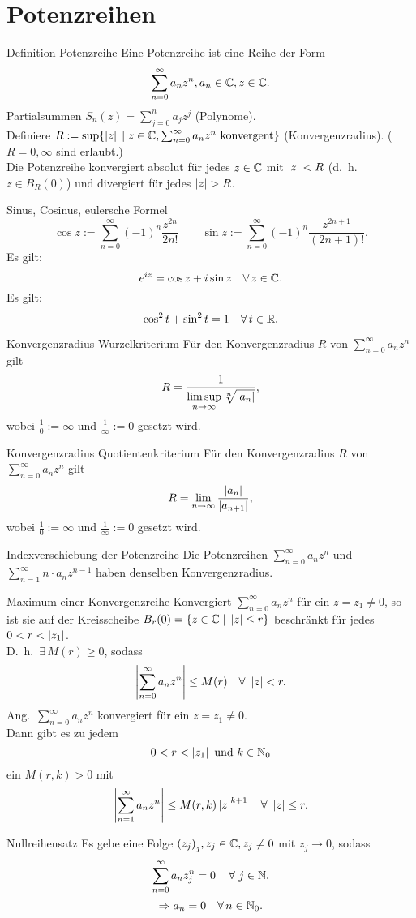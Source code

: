 \documentclass[main.tex]{subfiles}
\begin{document}
\section*{Potenzreihen}

\begin{karte}{Definition Potenzreihe}
    Eine Potenzreihe ist eine Reihe der Form
    \[ \sum_{n=0}^\infty a_n z^n, a_n \in\mathbb{C}, z \in\mathbb{C}. \]
    Partialsummen \( S_n(z) = \sum_{j=0}^n a_j z^j \) (Polynome).\\
    Definiere \( R:= \sup \{ \left| z \right| \;\vert \; z\in\mathbb{C}, 
    \sum_{n=0}^\infty a_n z^n \text{ konvergent} \} \)
    (Konvergenzradius). (\( R = 0, \infty \) sind erlaubt.)\\
    Die Potenzreihe konvergiert absolut für jedes \( z\in\mathbb{C} \) 
    mit \( \left| z \right| < R \) (d.\ h.\  \( z\in B_R(0) \)) 
    und divergiert für jedes \( \left| z \right| > R \).
\end{karte}
\begin{karte}{Sinus, Cosinus, eulersche Formel}
    \[ \cos z := \sum_{n=0}^\infty {(-1)}^n \frac{z^{2n}}{2n!} 
    \qquad \sin z  := \sum_{n=0}^\infty {(-1)}^n 
    \frac{z^{2n+1}}{(2n+1)!}. \]
    Es gilt:
    \[ e^{iz} = \cos z + i \sin z \quad \forall z\in\C. \]
    Es gilt:
    \[ \cos^2 t + \sin^2 t = 1 \quad \forall t \in \R. \]
\end{karte}
\begin{karte}{Konvergenzradius Wurzelkriterium}
    Für den Konvergenzradius \( R \) von 
    \( \sum_{n=0}^\infty a_n z^n \) gilt
    \[ R = \frac{1}{\limsup\limits_{n\rightarrow\infty} \sqrt[n]{\left| a_n \right|}}, \]
    wobei \(\frac{1}{0} := \infty \) und 
    \( \frac{1}{\infty} := 0 \) gesetzt wird.
\end{karte}
\begin{karte}{Konvergenzradius Quotientenkriterium}
    Für den Konvergenzradius \( R \) von 
    \( \sum_{n=0}^\infty a_n z^n \) gilt
    \[ R = \lim\limits_{n\rightarrow\infty} \frac{\left|  a_n  \right|}{\left|  a_{n+1}  \right|}, \]
    wobei \(\frac{1}{0} := \infty \) und 
    \( \frac{1}{\infty} := 0 \) gesetzt wird.
\end{karte}
\begin{karte}{Indexverschiebung der Potenzreihe}
    Die Potenzreihen \( \sum_{n=0}^\infty a_n z^n \) 
    und \( \sum_{n=1}^\infty n \cdot a_n z^{n-1} \) 
    haben denselben Konvergenzradius.
\end{karte}
\begin{karte}{Maximum einer Konvergenzreihe}
    Konvergiert \( \sum_{n=0}^\infty a_n z^n \) 
    für ein \( z = z_1 \neq 0 \), so ist sie auf 
    der Kreisscheibe \( B_r (0)  
    = \{ z\in\mathbb{C} \;\vert \; \left| z \right|\leq r \} \)
    beschränkt für jedes \( 0 < r < \left| z_1 \right| \).\\
    D.\ h.\  \( \exists \, M(r) \geq 0 \), sodass
    \[ \abs{ \sum_{n=0}^\infty a_n z^n } \leq M(r) 
    \quad \forall \, \abs{z} < r. \]
    Ang.\  \( \sum_{n=0}^\infty a_n z^n \) konvergiert 
    für ein \( z = z_1 \neq 0 \). \\
    Dann gibt es zu jedem
    \[ 0 < r < \left| z_1 \right| \text{ und } k\in\mathbb{N}_0\]
    ein \( M(r,k) > 0 \) mit
    \[ \abs{ \sum_{n=1}^\infty a_n z^n } 
    \leq M(r,k) \abs{z}^{k+1} \quad \forall \, \abs{z}\leq r. \]
\end{karte}
\begin{karte}{Nullreihensatz}
    Es gebe eine Folge \( {(z_j)}_j, z_j \in\mathbb{C}, z_j 
    \neq 0 \) mit \( z_j \rightarrow 0 \), sodass 
    \[ \sum_{n=0}^\infty a_n z_j^n = 0 \quad \,\forall \, j\in\N. \]
    \[ \Rightarrow a_n = 0 \quad \forall n\in\N_0. \]
\end{karte}
\end{document}
